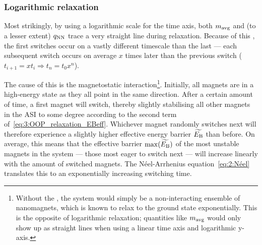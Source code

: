 \subsubsection{Logarithmic relaxation}
Most strikingly, by using a logarithmic scale for the time axis, both $m_\mathrm{avg}$ and (to a lesser extent) $q_\mathrm{NN}$ trace a very straight line during relaxation.
Because of this , the first switches occur on a vastly different timescale than the last --- each subsequent switch occurs on average $x$ times later than the previous switch ($t_{i+1} = x t_i \Rightarrow t_n = t_0 x^n$). \par
The cause of this is the magnetostatic interaction\footnote{
	Without the , the system would simply be a non-interacting ensemble of nanomagnets, which is known to relax to the ground state exponentially.
	This is the opposite of logarithmic relaxation; quantities like $m_\mathrm{avg}$ would only show up as straight lines when using a linear time axis and logarithmic y-axis.
}.
Initially, all magnets are in a high-energy state as they all point in the same direction.
After a certain amount of time, a first magnet will switch, thereby slightly stabilising all other magnets in the ASI to some degree according to the second term of~\cref{eq:3:OOP_relaxation_EBeff}.
Whichever magnet randomly switches next will therefore experience a slightly higher effective energy barrier $\widetilde{E_\mathrm{B}}$ than before.
On average, this means that the effective barrier $\max(\widetilde{E_\mathrm{B}})$ of the most unstable magnets in the system --- those most eager to switch next --- will increase linearly with the amount of switched magnets.
The N\'eel-Arrhenius equation~\eqref{eq:2:Néel} translates this to an exponentially increasing switching time. \\\par

